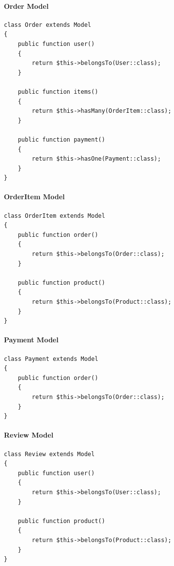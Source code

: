 \documentclass[12pt,a4paper]{article}
\begin{document}
\paragraph{Order Model}
\begin{verbatim}
class Order extends Model
{
    public function user()
    {
        return $this->belongsTo(User::class);
    }

    public function items()
    {
        return $this->hasMany(OrderItem::class);
    }

    public function payment()
    {
        return $this->hasOne(Payment::class);
    }
}
\end{verbatim}

\paragraph{OrderItem Model}
\begin{verbatim}
class OrderItem extends Model
{
    public function order()
    {
        return $this->belongsTo(Order::class);
    }

    public function product()
    {
        return $this->belongsTo(Product::class);
    }
}
\end{verbatim}

\paragraph{Payment Model}
\begin{verbatim}
class Payment extends Model
{
    public function order()
    {
        return $this->belongsTo(Order::class);
    }
}
\end{verbatim}

\paragraph{Review Model}
\begin{verbatim}
class Review extends Model
{
    public function user()
    {
        return $this->belongsTo(User::class);
    }

    public function product()
    {
        return $this->belongsTo(Product::class);
    }
}
\end{verbatim}

\end{document}
